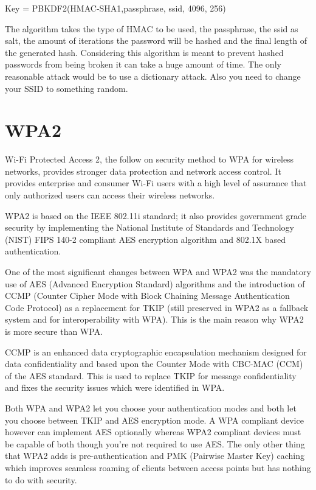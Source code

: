 \documentclass[a4paper,12pt,pagesize,headsepline,bibtotoc,titlepage]{scrartcl}
\begin{document}
Key = PBKDF2(HMAC-SHA1,passphrase, ssid, 4096, 256)

The algorithm takes the type of HMAC to be used, the passphrase, the ssid as salt, the amount of iterations the password will be hashed and the final length of the generated hash. Considering this algorithm is meant to prevent hashed passwords from being broken it can take a huge amount of time. The only reasonable attack would be to use a dictionary attack. Also you need to change your SSID to something random.


\section{WPA2}

Wi-Fi Protected Access 2, the follow on security method to WPA for wireless networks, provides stronger data protection and network access control. It provides enterprise and consumer Wi-Fi users with a high level of assurance that only authorized users can access their wireless networks. 

WPA2 is based on the IEEE 802.11i standard; it also provides government grade security by implementing the National Institute of Standards and Technology (NIST) FIPS 140-2 compliant AES encryption algorithm and 802.1X based authentication. 

One of the most significant changes between WPA and WPA2 was the mandatory use of AES (Advanced Encryption Standard) algorithms and the introduction of CCMP (Counter Cipher Mode with Block Chaining Message Authentication Code Protocol) as a replacement for TKIP (still preserved in WPA2 as a fallback system and for interoperability with WPA). This is the main reason why WPA2 is more secure than WPA.

CCMP is an enhanced data cryptographic encapsulation mechanism designed for data confidentiality and based upon the Counter Mode with CBC-MAC (CCM) of the AES standard. This is used to replace TKIP for message confidentiality and fixes the security issues which were identified in WPA.

Both WPA and WPA2 let you choose your authentication modes and both let you choose between TKIP and AES encryption mode.  A WPA compliant device however can implement AES optionally whereas WPA2 compliant devices must be capable of both though you're not required to use AES.  The only other thing that WPA2 adds is pre-authentication and PMK (Pairwise Master Key) caching which improves seamless roaming of clients between access points but has nothing to do with security.
\end{document}
